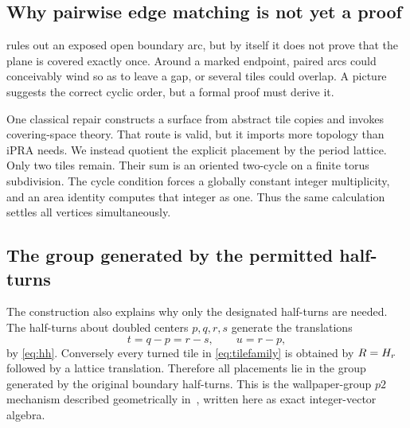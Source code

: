 \subsection{Why pairwise edge matching is not yet a proof}

 rules out an exposed open boundary arc, but by itself it does not prove that the plane is covered exactly once.  Around a marked endpoint, paired arcs could conceivably wind so as to leave a gap, or several tiles could overlap.  A picture suggests the correct cyclic order, but a formal proof must derive it.

One classical repair constructs a surface from abstract tile copies and invokes covering-space theory.  That route is valid, but it imports more topology than iPRA needs.  We instead quotient the explicit placement by the period lattice.  Only two tiles remain.  Their sum is an oriented two-cycle on a finite torus subdivision.  The cycle condition forces a globally constant integer multiplicity, and an area identity computes that integer as one.  Thus the same calculation settles all vertices simultaneously.

\subsection{The group generated by the permitted half-turns}

The construction also explains why only the designated half-turns are needed.  The half-turns about doubled centers \(p,q,r,s\) generate the translations
\[
 t=q-p=r-s,
 \qquad
 u=r-p,
\]
by \cref{eq:hh}.  Conversely every turned tile in \cref{eq:tilefamily} is obtained by \(R=H_{r}\) followed by a lattice translation.  Therefore all placements lie in the group generated by the original boundary half-turns.  This is the wallpaper-group \(p2\) mechanism described geometrically in~\cite{Schattschneider1980}, written here as exact integer-vector algebra.
